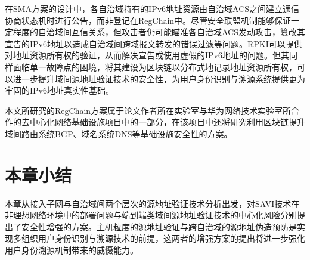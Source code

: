     在SMA方案的设计中，各自治域持有的IPv6地址资源由自治域ACS之间建立通信协商状态机时进行公告，而非登记在RegChain中。尽管安全联盟机制能够保证一定程度的自治域间互信关系，但攻击者仍可能瞄准各自治域ACS发动攻击，篡改其宣告的IPv6地址以造成自治域间跨域报文转发的错误过滤等问题。RPKI\cite{RFC6480}可以提供对地址资源所有权的验证，从而解决宣告或使用虚假的IPv6地址的问题。但其同样面临单一故障点的困境，将其建设为区块链以分布式地记录地址资源所有权，可以进一步提升域间源地址验证技术的安全性，为用户身份识别与溯源系统提供更为牢固的IPv6地址真实性基础。

    本文所研究的RegChain方案属于论文作者所在实验室与华为网络技术实验室所合作的去中心化网络基础设施项目中的一部分，在该项目中还将研究利用区块链提升域间路由系统BGP\cite{RFC4271}、域名系统DNS\cite{RFC1034,RFC1035}等基础设施安全性的方案。

  \section{本章小结}
  \label{IPv6_Security:summary}
  本章从接入子网与自治域间两个层次的源地址验证技术分析出发，对SAVI技术在非理想网络环境中的部署问题与端到端类域间源地址验证技术的中心化风险分别提出了安全性增强的方案。主机粒度的源地址验证与跨自治域的源地址伪造预防是实现多组织用户身份识别与溯源技术的前提，这两者的增强方案的提出将进一步强化用户身份溯源机制带来的威慑能力。